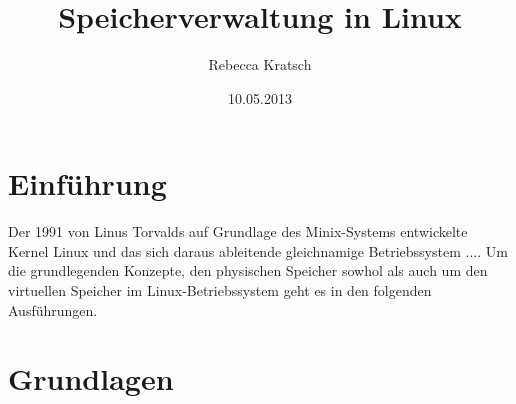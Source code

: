\documentclass[11pt,a4paper]{article}
\title{Speicherverwaltung in Linux}
\author{Rebecca Kratsch}
\date{10.05.2013}
\begin{document}
\maketitle



\section*{Einführung}

Der 1991 von Linus Torvalds auf Grundlage des Minix-Systems entwickelte Kernel Linux und das sich daraus ableitende gleichnamige Betriebssystem ....
\newline
Um die grundlegenden Konzepte, den physischen Speicher sowhol als auch um den virtuellen Speicher im Linux-Betriebssystem geht es in den folgenden Ausführungen. 

\section*{Grundlagen}
\end{document}
